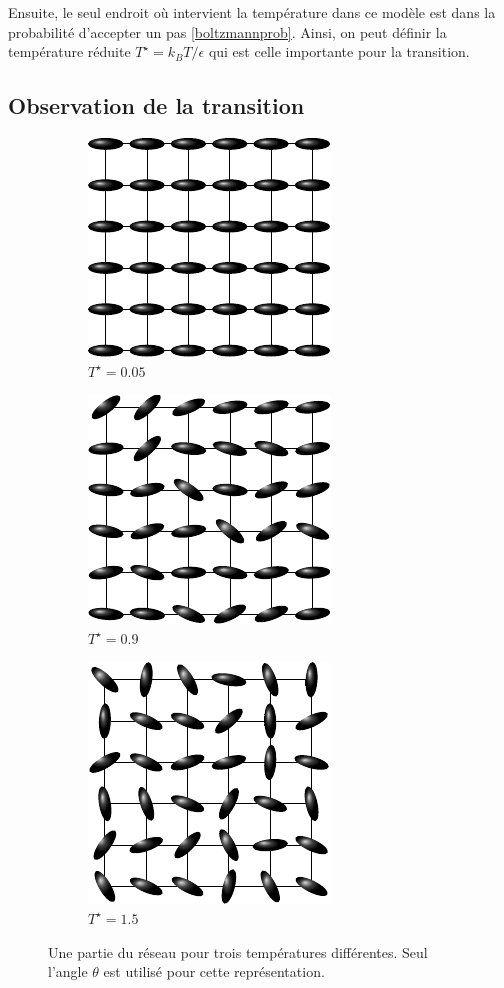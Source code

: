 \documentclass[11pt,a4paper]{article}
\numberwithin{equation}{section}
\begin{document}
Ensuite, le seul endroit où intervient la température dans ce modèle est dans la probabilité d'accepter un pas \ref{boltzmannprob}. Ainsi, on peut définir la température réduite $T^\star = k_B T /\epsilon$ qui est celle importante pour la transition.

\subsection{Observation de la transition}
\begin{figure}[h!]
\center
    \begin{subfigure}[b]{0.30\textwidth}
    	\center
    	\includegraphics[scale=1]{figures/00.pdf}
    	\caption{$T^\star =0.05$}
    	\label{fonda}
    \end{subfigure}	
	\begin{subfigure}[b]{0.30\textwidth}
    	\center
    	\includegraphics[scale=1]{figures/09.pdf}
    	\caption{$T^\star =0.9$}
    	\label{09}
    \end{subfigure}
    \begin{subfigure}[b]{0.30\textwidth}
    	\center
    	\includegraphics[scale=1]{figures/15.pdf}
    	\caption{$T^\star =1.5$}
    	\label{15}
    \end{subfigure}	
    \caption{Une partie du réseau pour trois températures différentes. Seul l'angle $\theta$ est utilisé pour cette représentation. }
    \label{lattice}
\end{figure}
\end{document}
